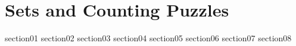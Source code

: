\chapter{Sets and Counting Puzzles}

{section01}
{section02}
{section03}
{section04}
{section05}
{section06}
{section07}
{section08}